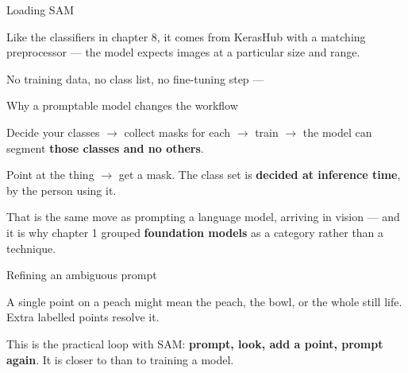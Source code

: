\documentclass[aspectratio=169,11pt,t]{beamer}
\begin{document}
\begin{frame}[shrink=25]{Loading SAM}
{\fontsize{9.4}{12.6}\selectfont\color{fg2}Like the classifiers in chapter 8, it comes from KerasHub with a matching preprocessor --- the model expects images at a particular size and range.\par}\vskip 4pt
{\fontsize{9.4}{12.6}\selectfont\color{fg2}No training data, no class list, no fine-tuning step --- \par}\vskip 4pt
\end{frame}

\begin{frame}[shrink=25]{Why a promptable model changes the workflow}
\begin{minipage}[t]{0.494\textwidth}
\begin{icardwarn}
Decide your classes $\rightarrow$ collect masks for each $\rightarrow$ train $\rightarrow$ the model can segment \textbf{those classes and no others}.
\end{icardwarn}
\end{minipage}%
\hfill
\begin{minipage}[t]{0.494\textwidth}
\begin{icardgood}
Point at the thing $\rightarrow$ get a mask. The class set is \textbf{decided at inference time}, by the person using it.
\end{icardgood}
\end{minipage}%
\begin{iband}[signal]
That is the same move as prompting a language model, arriving in vision --- and it is why chapter 1 grouped \textbf{foundation models} as a category rather than a technique.
\end{iband}
\end{frame}

\begin{frame}[shrink=25]{Refining an ambiguous prompt}
{\fontsize{9.4}{12.6}\selectfont\color{fg2}A single point on a peach might mean the peach, the bowl, or the whole still life. Extra labelled points resolve it.\par}\vskip 4pt
\begin{iband}[signal]
This is the practical loop with SAM: \textbf{prompt, look, add a point, prompt again}. It is closer to  than to training a model.
\end{iband}
\end{frame}
\end{document}

